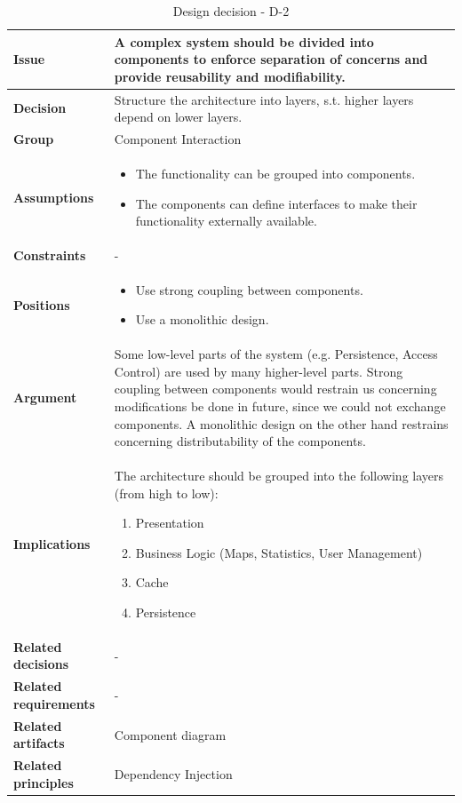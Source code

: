 \documentclass[11pt]{article}
\begin{document}
\begin{table}[h] \small
	\begin{tabularx}{\textwidth}{ | l | X |}
    	\hline
	\cellcolor[gray]{0.9}
    	\textbf{Issue} & A complex system should be divided into components to enforce separation of concerns and provide reusability and modifiability. \\
	\hline
	\cellcolor[gray]{0.9}
	\textbf{Decision} & Structure the architecture into layers, s.t. higher layers depend on lower layers. \\
	\hline
	\cellcolor[gray]{0.9}
	\textbf{Group} & Component Interaction \\
	\hline
	\cellcolor[gray]{0.9}
	\textbf{Assumptions} &
		\begin{itemize}
		\item The functionality can be grouped into components.
		\item The components can define interfaces to make their functionality externally available.
		\end{itemize}\\
	\hline
	\cellcolor[gray]{0.9}
	\textbf{Constraints} & - \\
	\hline
	\cellcolor[gray]{0.9}
	\textbf{Positions} &
		\begin{itemize}
		\item Use strong coupling between components.
		\item Use a monolithic design.
		\end{itemize}\\
	\hline
	\cellcolor[gray]{0.9}
	\textbf{Argument} & Some low-level parts of the system (e.g. Persistence, Access Control) are used by many higher-level parts. Strong coupling between components would restrain us concerning modifications be done in future, since we could not exchange components. A monolithic design on the other hand restrains concerning distributability of the components. \\
	\hline
	\cellcolor[gray]{0.9}
	\textbf{Implications} & The architecture should be grouped into the following layers (from high to low):
		\begin{enumerate}
		\item Presentation
		\item Business Logic (Maps, Statistics, User Management)
		\item Cache
		\item Persistence
		\end{enumerate}\\
	\hline
	\cellcolor[gray]{0.9}
	\textbf{Related decisions} & - \\
	\hline
	\cellcolor[gray]{0.9}
	\textbf{Related requirements} & -\\
	\hline
	\cellcolor[gray]{0.9}
	\textbf{Related artifacts} & Component diagram\\
	\hline
	\cellcolor[gray]{0.9}
	\textbf{Related principles} & Dependency Injection\\
	\hline
	\end{tabularx}
	\caption{Design decision - D-2}
	\label{dec:D2}
\end{table}
\end{document}
